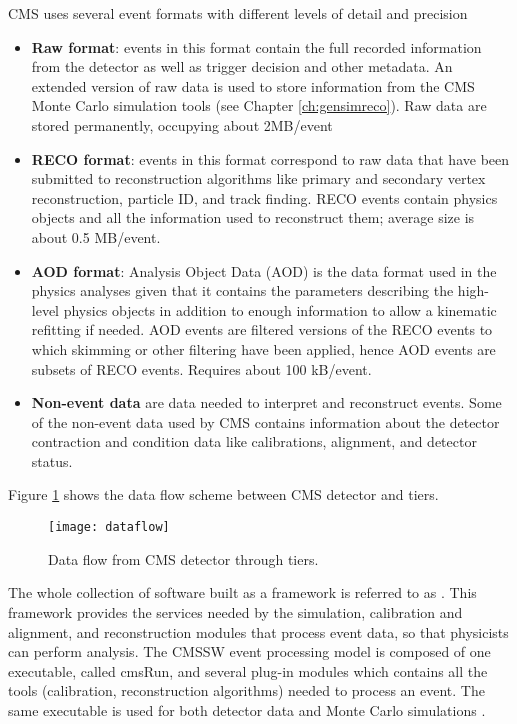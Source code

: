 CMS uses several event formats with different levels of detail and precision

\begin{itemize}
\item \textbf{Raw format}: events in this format contain the full recorded information from the detector as well as trigger decision and other metadata. An extended version of raw data is used to store information from the CMS Monte Carlo simulation tools (see Chapter \ref{ch:gensimreco}). Raw data are stored permanently, occupying about 2MB/event   
\item \textbf{RECO format}: events in this format correspond to raw data that have been submitted to reconstruction algorithms like primary and secondary vertex reconstruction, particle ID, and track finding. RECO events contain physics objects and all the information used to reconstruct them; average size is about 0.5 MB/event.     
\item \textbf{AOD format}: Analysis Object Data (AOD) is the data format used in the physics analyses given that it contains the parameters describing the high-level physics objects in addition to enough information to allow a kinematic refitting if needed. AOD events are filtered versions of the RECO events to which skimming or other filtering have been applied, hence AOD events are subsets of RECO events. Requires about 100 kB/event.
\item \textbf{Non-event data} are data needed to interpret and reconstruct events. Some of the non-event data used by CMS contains information about the detector contraction and condition data like calibrations, alignment, and detector status.  
\end{itemize}

\noindent Figure \ref{fig:dataflow} shows the data flow scheme between CMS detector and tiers.

\begin{figure}[h!]
  \centering
  \texttt{[image: dataflow]}
  \caption[Data flow from CMS detector through hardware Tiers]{Data flow from CMS detector through tiers.}
  \label{fig:dataflow}
\end{figure}


\noindent  The whole collection of software built as a framework is referred to as . This framework provides the services needed by the simulation, calibration and alignment, and reconstruction modules that process event data, so that physicists can perform analysis. The CMSSW event processing model is composed of one executable, called cmsRun, and several plug-in modules which contains all the tools  (calibration, reconstruction algorithms) needed to process an event. The same executable is used for both detector data and Monte Carlo simulations \cite{cmssw}.
